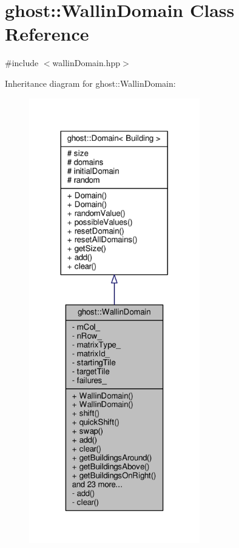 \hypertarget{classghost_1_1WallinDomain}{\section{ghost\-:\-:Wallin\-Domain Class Reference}
\label{classghost_1_1WallinDomain}
}


{\ttfamily \#include $<$wallin\-Domain.\-hpp$>$}



Inheritance diagram for ghost\-:\-:Wallin\-Domain\-:\nopagebreak
\begin{figure}[H]
\begin{center}
\leavevmode
\includegraphics[height=550pt]{classghost_1_1WallinDomain__inherit__graph}
\end{center}
\end{figure}


